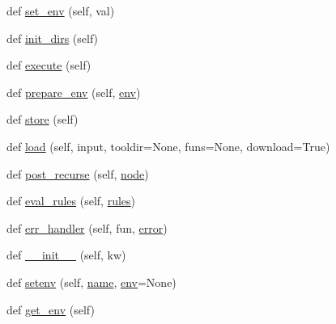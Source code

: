 \begin{DoxyCompactItemize}
\item 
def \hyperlink{classwaflib_1_1_configure_1_1_configuration_context_ad30b269279dd9c24e6d892bb3b2fc583}{set\+\_\+env} (self, val)
\item 
def \hyperlink{classwaflib_1_1_configure_1_1_configuration_context_a782925b68e221c10f8e08433329364c9}{init\+\_\+dirs} (self)
\item 
def \hyperlink{classwaflib_1_1_configure_1_1_configuration_context_a2dadcc441cc31bb49159c709bae0ec32}{execute} (self)
\item 
def \hyperlink{classwaflib_1_1_configure_1_1_configuration_context_a913063288a6135c3105acf180e7f0f0c}{prepare\+\_\+env} (self, \hyperlink{classwaflib_1_1_configure_1_1_configuration_context_a390267f6d3529fe07447ffb4925ca533}{env})
\item 
def \hyperlink{classwaflib_1_1_configure_1_1_configuration_context_aadaed27da973f44dde6eaa890026be35}{store} (self)
\item 
def \hyperlink{classwaflib_1_1_configure_1_1_configuration_context_ae13e6fac1db3060edb50337f97b7be3f}{load} (self, input, tooldir=None, funs=None, download=True)
\item 
def \hyperlink{classwaflib_1_1_configure_1_1_configuration_context_a9620736938604c56dc26964b06a24e2e}{post\+\_\+recurse} (self, \hyperlink{structnode}{node})
\item 
def \hyperlink{classwaflib_1_1_configure_1_1_configuration_context_af1b5fdd6d958f8b996dba916c44ec9fa}{eval\+\_\+rules} (self, \hyperlink{classwaflib_1_1_configure_1_1_configuration_context_a279ad5a7c2630c4416afc36cad85a2db}{rules})
\item 
def \hyperlink{classwaflib_1_1_configure_1_1_configuration_context_acc349b079382fdac3d626eb46bd54b7e}{err\+\_\+handler} (self, fun, \hyperlink{sndfile__save_8m_ada4b423bc19e6ff5c5b514e55f518a82}{error})
\item 
def \hyperlink{classwaflib_1_1_configure_1_1_configuration_context_a0f139855aa53920d6f30a05e10253ab0}{\+\_\+\+\_\+init\+\_\+\+\_\+} (self, kw)
\item 
def \hyperlink{classwaflib_1_1_configure_1_1_configuration_context_a2ed4960105cdf08c13cd178367ae1818}{setenv} (self, \hyperlink{lib_2expat_8h_a1b49b495b59f9e73205b69ad1a2965b0}{name}, \hyperlink{classwaflib_1_1_configure_1_1_configuration_context_a390267f6d3529fe07447ffb4925ca533}{env}=None)
\item 
def \hyperlink{classwaflib_1_1_configure_1_1_configuration_context_a5f2dfad34690147826b09413246140f7}{get\+\_\+env} (self)
\item 

\end{DoxyCompactItemize}
